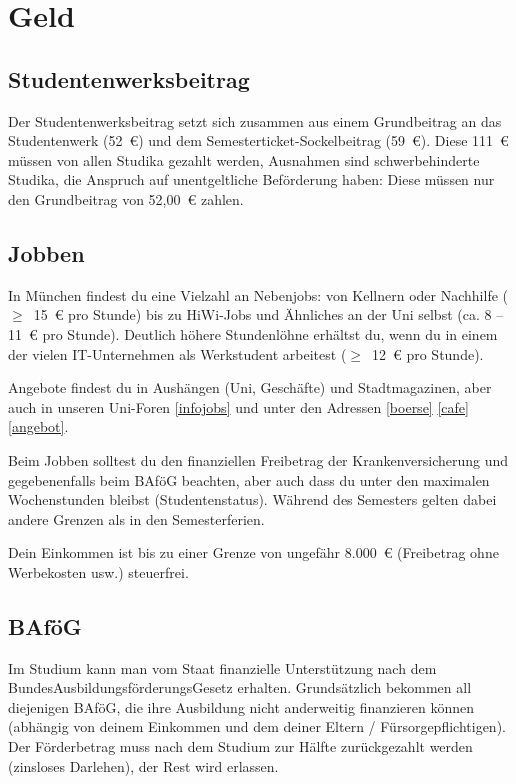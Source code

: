 \chapter{Geld}

\section{Studentenwerksbeitrag}
Der Studentenwerksbeitrag setzt sich zusammen aus einem Grundbeitrag an das Studentenwerk (52~€) und dem
Semesterticket-Sockelbeitrag (59~€).
Diese 111~€ müssen von allen Studika gezahlt werden, Ausnahmen sind schwerbehinderte Studika, die Anspruch
auf unentgeltliche Beförderung haben: Diese müssen nur den Grundbeitrag von 52,00~€ zahlen.

\section{Jobben}
In München findest du eine Vielzahl an Nebenjobs: von Kellnern oder Nachhilfe ($\geq$~15~€ pro Stunde) bis zu HiWi-Jobs und Ähnliches an der Uni selbst (ca. 8 -- 11~€ pro Stunde). Deutlich höhere Stundenlöhne erhältst du, wenn du in einem der vielen IT-Unternehmen als Werkstudent arbeitest ($\geq$~12~€ pro Stunde).

Angebote findest du in Aushängen (Uni, Geschäfte) und Stadtmagazinen, aber auch in unseren Uni-Foren \ref{infojobs} und unter den Adressen
\ref{boerse} \ref{cafe} \ref{angebot}.

Beim Jobben solltest du den finanziellen Freibetrag der Krankenversicherung und gegebenenfalls beim BAföG beachten, aber auch dass du unter den maximalen Wochenstunden bleibst (Studentenstatus). Während des Semesters gelten dabei andere Grenzen als in den Semesterferien.

Dein Einkommen ist bis zu einer Grenze von ungefähr 8.000~€ (Freibetrag ohne Werbekosten usw.) steuerfrei.

\begin{urlList}
\end{urlList}


\section{BAföG}
Im Studium kann man vom Staat finanzielle Unterstützung nach dem BundesAusbildungsförderungsGesetz erhalten. Grundsätzlich bekommen all diejenigen BAföG, die ihre Ausbildung nicht anderweitig finanzieren können (abhängig von deinem Einkommen und dem deiner Eltern / Fürsorgepflichtigen). Der Förderbetrag muss nach dem Studium zur Hälfte zurückgezahlt werden (zinsloses Darlehen), der Rest wird erlassen.

